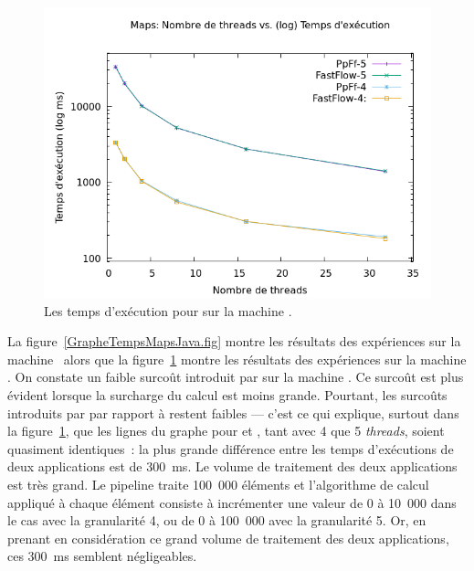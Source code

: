 \begin{figure}
\centering
     \includegraphics[width=1.0\textwidth]{Figures/graphe_temps_Japet_Maps.png}
      \caption{Les temps d'ex\'ecution pour  sur la machine .}
       \label{GrapheTempsMapstJapet.fig}
\end{figure}


La figure~\ref{GrapheTempsMapsJava.fig} montre les r\'esultats des exp\'eriences sur la machine \ alors que la figure~\ref{GrapheTempsMapstJapet.fig} montre les r\'esultats des exp\'eriences sur la machine . On constate un faible surco\^ut
introduit par  sur la machine . Ce surco\^ut est plus \'evident lorsque la surcharge du calcul est moins grande. Pourtant, les surco\^uts introduits par  par rapport \`a  restent faibles --- c'est ce qui explique, surtout dans la figure~\ref{GrapheTempsMapstJapet.fig}, que les lignes du graphe pour  et , tant avec 4 que 5 \emph{threads}, soient quasiment identiques~: la plus grande diff\'erence entre les temps d'ex\'ecutions de deux applications est de 300~ms. Le volume de traitement des deux applications est tr\`es grand. Le pipeline traite 100~000 \'el\'ements et l'algorithme de calcul appliqu\'e \`a chaque \'el\'ement consiste \`a incr\'ementer une valeur de 0 \`a 10~000 dans le cas avec la granularit\'e 4, ou de 0 \`a 100~000 avec la granularit\'e 5. Or, en prenant en consid\'eration ce grand volume de traitement des deux applications, ces 300~ms semblent n\'egligeables.

